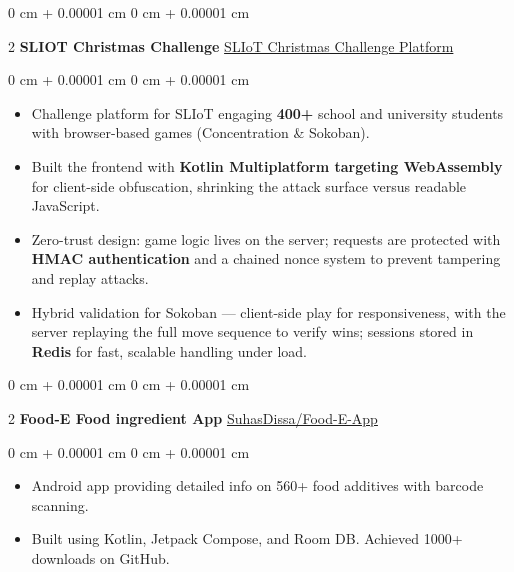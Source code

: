 \documentclass[10pt, letterpaper]{article}
\newenvironment{highlights}{ \begin{itemize}[ topsep=0.10 cm, parsep=0.10 cm, partopsep=0pt,
itemsep=0pt, leftmargin=0 cm + 10pt ] }{ \end{itemize} } %
\newenvironment{onecolentry}{ \begin{adjustwidth}{ 0 cm + 0.00001 cm }{ 0 cm + 0.00001 cm }
}{ \end{adjustwidth} } %
\newenvironment{twocolentry}[2][]{ \onecolentry \def\secondColumn{#2} \setcolumnwidth{\fill, 4.5 cm}
\begin{paracol}{2} }{ \switchcolumn \raggedleft \secondColumn \end{paracol}
\endonecolentry } %
\begin{document}
  \begin{twocolentry}
    {\href{https://medium.com/p/24555b16487a}{SLIoT Christmas Challenge Platform}}
    \textbf{SLIOT Christmas Challenge}
  \end{twocolentry}
  \vspace{0.10 cm}
  \begin{onecolentry}
    \begin{highlights}
      \item Challenge platform for SLIoT engaging \textbf{400+} school and university
      students with browser-based games (Concentration \& Sokoban).
      \item Built the frontend with \textbf{Kotlin Multiplatform targeting WebAssembly}
      for client-side obfuscation, shrinking the attack surface versus readable JavaScript.
      \item Zero-trust design: game logic lives on the server; requests are protected with
      \textbf{HMAC authentication} and a chained nonce system to prevent tampering and
      replay attacks.
      \item Hybrid validation for Sokoban — client-side play for responsiveness, with the
      server replaying the full move sequence to verify wins; sessions stored in
      \textbf{Redis} for fast, scalable handling under load.
    \end{highlights}
  \end{onecolentry}

  \vspace{0.5 cm}

  \begin{twocolentry}
    {\href{https://github.com/SuhasDissa/Food-E-App}{SuhasDissa/Food-E-App}} \textbf{Food-E
    Food ingredient App}
  \end{twocolentry}
  \vspace{0.10 cm}
  \begin{onecolentry}
    \begin{highlights}
      \item Android app providing detailed info on 560+ food additives with
      barcode scanning. \item Built using Kotlin, Jetpack Compose, and Room DB.
      Achieved 1000+ downloads on GitHub.
    \end{highlights}
  \end{onecolentry}

  \vspace{0.5 cm}
\end{document}
